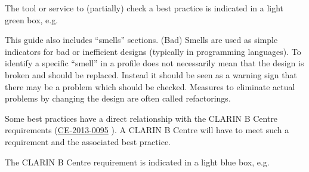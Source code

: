 
The tool or service to (partially) check a best practice is indicated in a light green box, e.g.

This guide also includes ``smells'' sections. (Bad) Smells are used as simple indicators for bad or inefficient designs (typically in programming languages). To identify a specific ``smell'' in a profile does not necessarily mean that the design is broken and should be replaced. Instead it should be seen as a warning sign that there may be a problem which should be checked. Measures to eliminate actual problems by changing the design are often called refactorings. 

Some best practices have a direct relationship with the CLARIN B Centre requirements (\href{http://hdl.handle.net/11372/DOC-78}{CE-2013-0095} \cite{ce20130095}). A CLARIN B Centre will have to meet such a requirement and the associated best practice. 

The CLARIN B Centre requirement is indicated in a light blue box, e.g.
